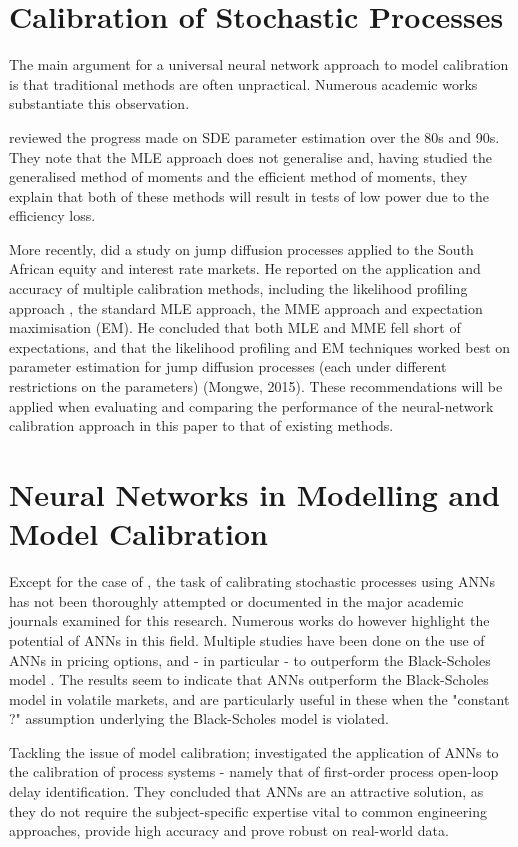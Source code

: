 \documentclass[11pt,oneside,openany,a4paper,english, report, goldenblock
]{usthesis}
\begin{document}
\section{Calibration of Stochastic Processes}
The main argument for a universal neural network approach to model calibration is that traditional methods are often unpractical. Numerous academic works substantiate this observation.


\citet{Nielsen} reviewed the progress made on SDE parameter estimation over the 80s and 90s. They note that the MLE approach does not generalise and, having studied the generalised method of moments and the efficient method of moments, they explain that both of these methods will result in tests of low power due to the efficiency loss.


More recently, \citet{Mongwe} did a study on jump diffusion processes applied to the South African equity and interest rate markets. He reported on the application and accuracy of multiple calibration methods, including the likelihood profiling approach \citep{Honore}, the standard MLE approach, the MME approach and expectation maximisation (EM). He concluded that both MLE and MME fell short of expectations, and that the likelihood profiling and EM techniques worked best on parameter estimation for jump diffusion processes (each under different restrictions on the parameters) (Mongwe, 2015). These recommendations will be applied when evaluating and comparing the performance of the neural-network calibration approach in this paper to that of existing methods.


\section{Neural Networks in Modelling and Model Calibration}
Except for the case of \citet{Xie}, the task of calibrating stochastic processes using ANNs has not been thoroughly attempted or documented in the major academic journals examined for this research. Numerous works do however highlight the potential of ANNs in this field.
Multiple studies have been done on the use of ANNs in pricing options, and - in particular - to outperform the Black-Scholes model \citealp{Yao}. The results seem to indicate that ANNs outperform the Black-Scholes model in volatile markets, and are particularly useful in these when the "constant ?" assumption underlying the Black-Scholes model is violated.


Tackling the issue of model calibration; \citet{Samad} investigated the application of ANNs to the calibration of process systems - namely that of first-order process open-loop delay identification. They concluded that ANNs are an attractive solution, as they do not require the subject-specific expertise vital to common engineering approaches, provide high accuracy and prove robust on real-world data.
\end{document}
